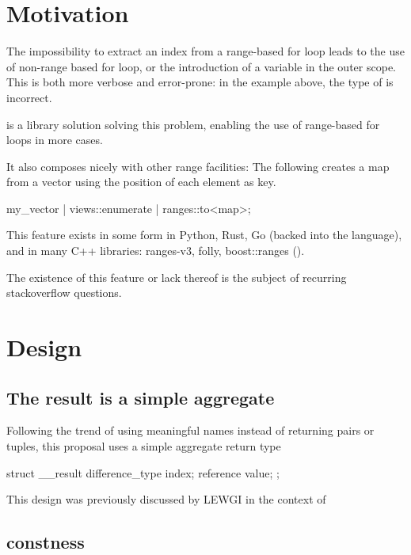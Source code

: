 \documentclass{wg21}
\begin{document}
\section{Motivation}

The impossibility to extract an index from a range-based for loop leads to the use of non-range based for loop, 
or the introduction of a variable in the outer scope. This is both more verbose and error-prone: in the example above, the type of  is incorrect. 

 is a library solution solving this problem, enabling the use of range-based for loops in more cases.

It also composes nicely with other range facilities:
The following creates a map from a vector using the position of each element as key.
 
\begin{colorblock}
my_vector | views::enumerate | ranges::to<map>;
\end{colorblock}

This feature exists in some form in Python, Rust, Go (backed into the language), and in many C++ libraries: ranges-v3, folly, boost::ranges ().


The existence of this feature or lack thereof is the subject of recurring stackoverflow questions.  


\section{Design}

\subsection{The result is a simple aggregate}

Following the trend of using meaningful names instead of returning pairs or tuples, this proposal uses a simple aggregate return type

\begin{colorblock}

struct __result {
    difference_type index;
    reference value;
};
\end{colorblock}

This design was previously discussed by LEWGI in the context of \cite{P1894R0}

\subsection{constness}
\end{document}
